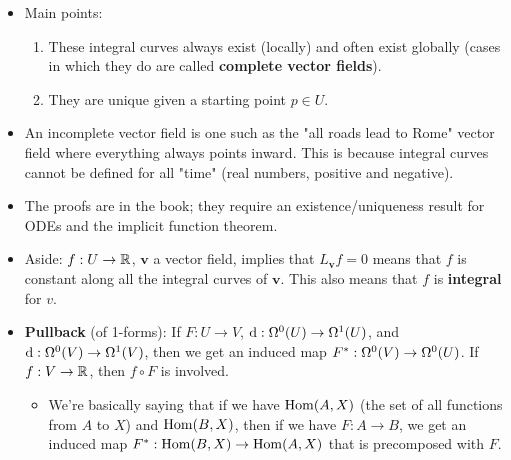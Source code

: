 \documentclass[../notes.tex]{subfiles}
\begin{document}
\begin{itemize}
\begin{itemize}
    \end{itemize}
    \item Main points:
    \begin{enumerate}
        \item These integral curves always exist (locally) and often exist globally (cases in which they do are called \textbf{complete vector fields}).
        \item They are unique given a starting point $p\in U$.
    \end{enumerate}
    \item An incomplete vector field is one such as the "all roads lead to Rome" vector field where everything always points inward. This is because integral curves cannot be defined for all "time" (real numbers, positive and negative).
    \item The proofs are in the book; they require an existence/uniqueness result for ODEs and the implicit function theorem.
    \item Aside: $f:U\to\R$, $\bm{v}$ a vector field, implies that $L_{\bm{v}}f=0$ means that $f$ is constant along all the integral curves of $\bm{v}$. This also means that $f$ is \textbf{integral} for $v$.
    \item \textbf{Pullback} (of 1-forms): If $F:U\to V$, $\dd:\ome[0]{U}\to\ome[1]{U}$, and $\dd:\ome[0]{V}\to\ome[1]{V}$, then we get an induced map $F^*:\ome[0]{V}\to\ome[0]{U}$. If $f:V\to\R$, then $f\circ F$ is involved.
    \begin{itemize}
        \item We're basically saying that if we have $\Hom(A,X)$ (the set of all functions from $A$ to $X$) and $\Hom(B,X)$, then if we have $F:A\to B$, we get an induced map $F^*:\Hom(B,X)\to\Hom(A,X)$ that is precomposed with $F$.
    \end{itemize}
\end{itemize}
\end{document}
